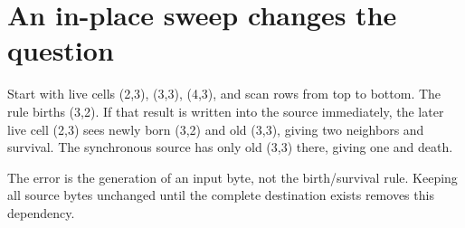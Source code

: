\section{An in-place sweep changes the
  question}\label{008-life-generations-x-inplace-an-in-place-sweep-changes-the-question}

Start with live cells (2,3), (3,3), (4,3), and scan rows from top to
bottom. The rule births (3,2). If that result is written into the source
immediately, the later live cell (2,3) sees newly born (3,2) and old
(3,3), giving two neighbors and survival. The synchronous source has
only old (3,3) there, giving one and death.

The error is the generation of an input byte, not the birth/survival
rule. Keeping all source bytes unchanged until the complete destination
exists removes this dependency.
